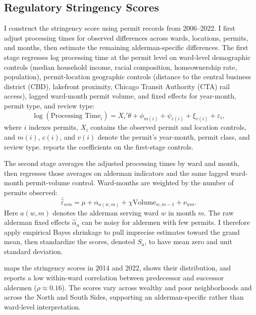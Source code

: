 \subsection{Regulatory Stringency Scores}
\label{subsec:stringency}

I construct the stringency score using permit records from 2006--2022.
I first adjust processing times for observed differences across wards, locations, permits, and months, then estimate the remaining alderman-specific differences.
The first stage regresses log processing time at the permit level on ward-level demographic controls (median household income, racial composition, homeownership rate, population), permit-location geographic controls (distance to the central business district (CBD), lakefront proximity, Chicago Transit Authority (CTA) rail access), lagged ward-month permit volume, and fixed effects for year-month, permit type, and review type:
%
\begin{equation} \label{eq:stringency_reg1}
    \log(\text{Processing Time}_{i}) = X_i'\theta + \phi_{m(i)} + \psi_{c(i)} + \xi_{v(i)} + \varepsilon_{i},
\end{equation}
%
where $i$ indexes permits, $X_i$ contains the observed permit and location controls, and $m(i)$, $c(i)$, and $v(i)$ denote the permit's year-month, permit class, and review type.
 reports the coefficients on the first-stage controls.

The second stage averages the adjusted processing times by ward and month, then regresses those averages on alderman indicators and the same lagged ward-month permit-volume control.
Ward-months are weighted by the number of permits observed:
%
\begin{equation} \label{eq:stringency_reg2}
    \bar{\hat{\varepsilon}}_{wm} = \mu + \alpha_{a(w,m)} + \chi \text{Volume}_{w,m-1} + \nu_{wm}.
\end{equation}
%
Here $a(w,m)$ denotes the alderman serving ward $w$ in month $m$.
The raw alderman fixed effects $\hat{\alpha}_a$ can be noisy for aldermen with few permits.
I therefore apply empirical Bayes shrinkage \citep{kline_systemic_2022, kline_discrimination_2024} to pull imprecise estimates toward the grand mean, then standardize the scores, denoted $S_a$, to have mean zero and unit standard deviation.

 maps the stringency scores in 2014 and 2022, shows their distribution, and reports a low within-ward correlation between predecessor and successor aldermen ($\rho \approx 0.16$).
The scores vary across wealthy and poor neighborhoods and across the North and South Sides, supporting an alderman-specific rather than ward-level interpretation.

